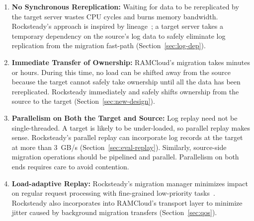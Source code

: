 \begin{enumerate}

\item \textbf{No Synchronous Rereplication:} Waiting for data to be rereplicated by
the target server wastes CPU cycles and burns memory bandwidth.
Rocksteady's approach is inspired by
lineage~\cite{spark}; a target server takes a temporary dependency on the
source's log data to safely eliminate log replication from the migration
fast-path (Section~\ref{sec:log-dep}).

\item \textbf{Immediate Transfer of Ownership:} RAMCloud's migration takes minutes
or hours. During this time, no load can be shifted away from the source
because the target cannot safely take ownership until all
the data has been rereplicated.  Rocksteady immediately and safely shifts
ownership from the source to the target (Section~\ref{sec:new-design}).


\item \textbf{Parallelism on Both the Target and Source:} Log replay need not be
single-threaded.  A target is likely to be under-loaded, so parallel
replay makes sense. Rocksteady's parallel replay can incorporate log records
at the target at more than 3~GB/s (Section~\ref{sec:eval-replay}). Similarly,
source-side migration operations should be pipelined and parallel. Parallelism
on both ends requires care to avoid contention.

\item \textbf{Load-adaptive Replay:} Rocksteady's migration manager minimizes impact
on regular request processing with fine-grained low-priority
tasks~\cite{morsel-driven-parallelism,sparrow}. Rocksteady also incorporates
into RAMCloud's transport layer to minimize jitter caused by background
migration transfers (Section~\ref{sec:qos}).

\end{enumerate}
